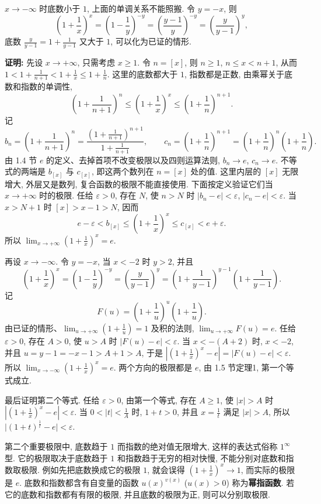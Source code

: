 \documentclass[UTF8,openany]{ctexbook}
\theoremstyle{chinesetextbook}
\newenvironment{cnproof}{\par\indent\textbf{证明:} \ignorespaces}{\par}
\begin{document}
$x\to-\infty$ 时底数小于 $1$, 上面的单调关系不能照搬. 令 $y=-x$, 则
\[
\left(1+\frac1x\right)^x=\left(1-\frac1y\right)^{-y}=\left(\frac{y-1}y\right)^{-y}=\left(\frac y{y-1}\right)^y,
\]
底数 $\displaystyle\frac y{y-1}=1+\frac1{y-1}$ 又大于 $1$, 可以化为已证的情形.
\begin{cnproof}
先设 $x\to+\infty$, 只需考虑 $x\ge1$. 令 $n=[x]$, 则 $n\ge1$, $n\le x<n+1$, 从而 $\displaystyle1<1+\frac1{n+1}<1+\frac1x\le1+\frac1n$. 这里的底数都大于 $1$, 指数都是正数, 由乘幂关于底数和指数的单调性,
\[
\left(1+\frac1{n+1}\right)^n\le\left(1+\frac1x\right)^x\le\left(1+\frac1n\right)^{n+1}.
\]
记
\[
b_n=\left(1+\frac1{n+1}\right)^n=\frac{\left(1+\frac1{n+1}\right)^{n+1}}{1+\frac1{n+1}},\qquad c_n=\left(1+\frac1n\right)^{n+1}=\left(1+\frac1n\right)^n\left(1+\frac1n\right).
\]
由 1.4 节 $e$ 的定义、去掉首项不改变极限以及四则运算法则, $b_n\to e$, $c_n\to e$. 不等式的两端是 $b_{[x]}$ 与 $c_{[x]}$, 即这两个数列在 $n=[x]$ 处的值. 这里内层的 $[x]$ 无限增大, 外层又是数列, 复合函数的极限不能直接使用. 下面按定义验证它们当 $x\to+\infty$ 时的极限. 任给 $\varepsilon>0$, 存在 $N$, 使 $n>N$ 时 $|b_n-e|<\varepsilon$, $|c_n-e|<\varepsilon$. 当 $x>N+1$ 时 $[x]>x-1>N$, 因而
\[
e-\varepsilon<b_{[x]}\le\left(1+\frac1x\right)^x\le c_{[x]}<e+\varepsilon.
\]
所以 $\displaystyle\lim_{x\to+\infty}\left(1+\frac1x\right)^x=e$.

再设 $x\to-\infty$. 令 $y=-x$, 当 $x<-2$ 时 $y>2$, 并且
\[
\left(1+\frac1x\right)^x=\left(1-\frac1y\right)^{-y}=\left(\frac y{y-1}\right)^y=\left(1+\frac1{y-1}\right)^{y-1}\left(1+\frac1{y-1}\right).
\]
记
\[
F(u)=\left(1+\frac1u\right)^u\left(1+\frac1u\right).
\]
由已证的情形、$\displaystyle\lim_{u\to+\infty}\left(1+\frac1u\right)=1$ 及积的法则, $\displaystyle\lim_{u\to+\infty}F(u)=e$. 任给 $\varepsilon>0$, 存在 $A>0$, 使 $u>A$ 时 $|F(u)-e|<\varepsilon$. 当 $x<-(A+2)$ 时, $x<-2$, 并且 $u=y-1=-x-1>A+1>A$, 于是 $\displaystyle\left|\left(1+\frac1x\right)^x-e\right|=|F(u)-e|<\varepsilon$. 所以 $\displaystyle\lim_{x\to-\infty}\left(1+\frac1x\right)^x=e$. 两个方向的极限都是 $e$, 由 1.5 节定理1, 第一个等式成立.

最后证明第二个等式. 任给 $\varepsilon>0$, 由第一个等式, 存在 $A\ge1$, 使 $|x|>A$ 时 $\displaystyle\left|\left(1+\frac1x\right)^x-e\right|<\varepsilon$. 当 $\displaystyle0<|t|<\frac1A$ 时, $1+t>0$, 并且 $\displaystyle x=\frac1t$ 满足 $|x|>A$, 所以 $\bigl|(1+t)^{\frac1t}-e\bigr|<\varepsilon$.
\end{cnproof}
第二个重要极限中, 底数趋于 $1$ 而指数的绝对值无限增大, 这样的表达式俗称 $1^\infty$ 型. 它的极限取决于底数趋于 $1$ 和指数趋于无穷的相对快慢, 不能分别对底数和指数取极限. 例如先把底数换成它的极限 $1$, 就会误得 $\displaystyle\left(1+\frac1x\right)^x\to1$, 而实际的极限是 $e$. 底数和指数都含有自变量的函数 $u(x)^{v(x)}$ ($u(x)>0$) 称为\textbf{幂指函数}. 若它的底数和指数都有有限的极限, 并且底数的极限为正, 则可以分别取极限.
\end{document}

